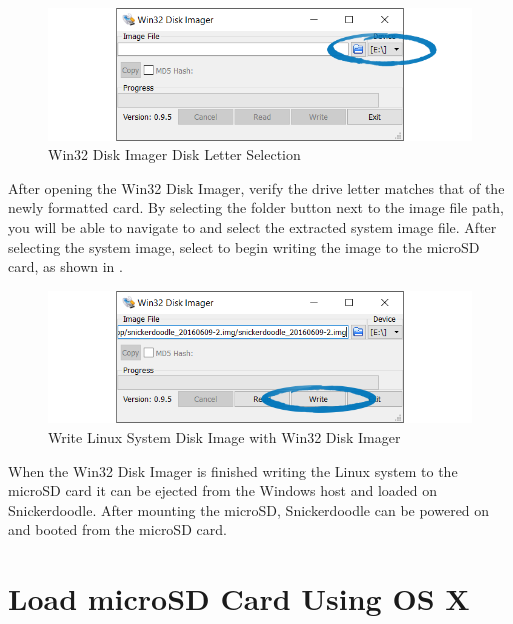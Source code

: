 \begin{figure}
	\centering
	\includegraphics{images/Win32_Disk_Imager.png}
	\caption{Win32 Disk Imager Disk Letter Selection}
\end{figure}

After opening the Win32 Disk Imager, verify the drive letter matches that of the newly formatted card. By selecting the folder button next to the image file path, you will be able to navigate to and select the extracted system image file. After selecting the system image, select  to begin writing the image to the microSD card, as shown in . \\


\begin{figure}
	\centering
	\includegraphics{images/Win32_Disk_Imager_Write_Image.png}
	\caption{Write Linux System Disk Image with Win32 Disk Imager}
	\label{fig:win32diskimagewrite}
\end{figure}


When the Win32 Disk Imager is finished writing the Linux system to the microSD card it can be ejected from the Windows host and loaded on Snickerdoodle. After mounting the microSD, Snickerdoodle can be powered on and booted from the microSD card. %

\section{Load microSD Card Using OS X}


